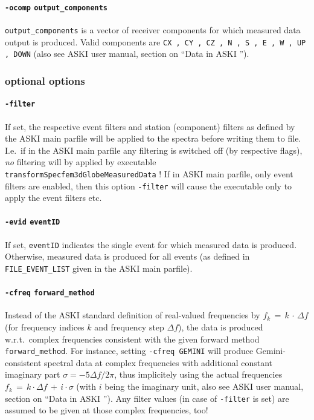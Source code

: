 \documentclass[12pt,a4paper]{article}
\newcommand{\lcode}[1]{\nolinkurl{#1}}
\newcommand{\ASKI}{ {\ttfamily ASKI} }
\begin{document}
\paragraph{\lcode{-ocomp} \lcode{output_components}}
\lcode{output_components} is a vector of receiver components for which measured data output is produced.
Valid components are
\lcode{CX , CY , CZ , N , S , E , W , UP , DOWN}
(also see \ASKI{} user manual, section on ``Data in \ASKI{}'').
\subsubsection*{optional options}
\paragraph{\lcode{-filter}}
If set, the respective event filters and station (component) filters as defined by the \ASKI{} main parfile will 
be applied to the spectra before writing
them to file. I.e.\, if in the \ASKI{} main parfile any filtering is switched off (by respective flags), 
\emph{no} filtering will by applied by executable \lcode{transformSpecfem3dGlobeMeasuredData} ! If in \ASKI{}
main parfile, only event filters are enabled, then this option \lcode{-filter} will cause the executable only
to apply the event filters etc.
\paragraph{\lcode{-evid} \lcode{eventID}}
If set, \lcode{eventID} indicates the single event for which measured data is produced. Otherwise,
measured data is produced for all events (as defined in \lcode{FILE_EVENT_LIST} given in the \ASKI{} main parfile).
\paragraph{\lcode{-cfreq} \lcode{forward_method}}
Instead of the \ASKI{} standard definition of real-valued frequencies by $f_k \,=\, k \,\cdot\, \Delta f$
(for frequency indices $k$ and frequency step $\Delta f$), the data is produced w.r.t.\ complex frequencies
consistent with the given forward method \lcode{forward_method}.
For instance, setting \lcode{-cfreq GEMINI} will produce Gemini-consistent spectral data at complex frequencies
with additional constant imaginary part $\sigma = -5\Delta f/2\pi$,
thus implicitely using the actual frequencies $f_k \,=\, k \cdot \Delta f \,+\,i\cdot \sigma$
(with $i$ being the imaginary unit, also see \ASKI{} user manual, section on ``Data in \ASKI{}'').
Any filter values (in case of \lcode{-filter} is set) are assumed to be given at those complex frequencies, too!
\end{document}
